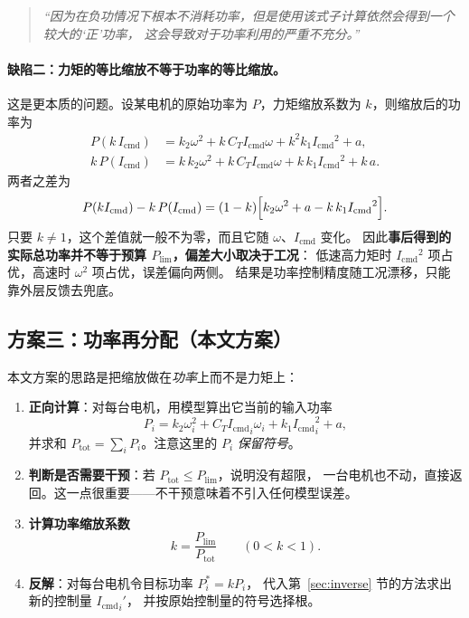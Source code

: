 \documentclass[cn,blue,11pt,device=normal]{elegantnote}
\newcommand{\Icmd}{I_{\mathrm{cmd}}{}}
\newcommand{\CT}{C_{T}{}}
\newcommand{\Plim}{P_{\mathrm{lim}}{}}
\begin{document}
\begin{quote}
\itshape
“因为在负功情况下根本不消耗功率，但是使用该式子计算依然会得到一个较大的‘正’功率，
这会导致对于功率利用的严重不充分。”
\end{quote}

\paragraph{缺陷二：力矩的等比缩放不等于功率的等比缩放。}
这是更本质的问题。设某电机的原始功率为 $P$，力矩缩放系数为 $k$，则缩放后的功率为
\begin{align}
  P(k\,\Icmd) &= k_2\omega^2 + k\,\CT\Icmd\omega + k^{2}k_1\Icmd^{2} + a ,\\
  k\,P(\Icmd) &= k\,k_2\omega^2 + k\,\CT\Icmd\omega + k\,k_1\Icmd^{2} + k\,a .
\end{align}
两者之差为
\begin{equation}\label{eq:scalegap}
  P(k\Icmd) - k\,P(\Icmd)
  = (1-k)\Bigl[k_2\omega^2 + a - k\,k_1\Icmd^{2}\Bigr] .
\end{equation}
只要 $k\ne1$，这个差值就一般不为零，而且它随 $\omega$、$\Icmd$ 变化。
因此\textbf{事后得到的实际总功率并不等于预算 $\Plim$，偏差大小取决于工况}：
低速高力矩时 $\Icmd^2$ 项占优，高速时 $\omega^2$ 项占优，误差偏向两侧。
结果是功率控制精度随工况漂移，只能靠外层反馈去兜底。

\subsection{方案三：功率再分配（本文方案）}

本文方案的思路是把缩放做在\emph{功率}上而不是力矩上：

\begin{enumerate}
  \item \textbf{正向计算}：对每台电机，用模型算出它当前的输入功率
  \begin{equation}\label{eq:forward}
    P_i = k_2\omega_i^{2} + \CT{\Icmd}_i\omega_i + k_1{\Icmd}_i^{2} + a ,
  \end{equation}
  并求和 $P_{\mathrm{tot}} = \sum_i P_i$。注意这里的 $P_i$ \emph{保留符号}。
  \item \textbf{判断是否需要干预}：若 $P_{\mathrm{tot}} \le \Plim$，说明没有超限，
  一台电机也不动，直接返回。这一点很重要——不干预意味着不引入任何模型误差。
  \item \textbf{计算功率缩放系数}
  \begin{equation}\label{eq:kscale}
    k = \frac{\Plim}{P_{\mathrm{tot}}} \qquad (0<k<1).
  \end{equation}
  \item \textbf{反解}：对每台电机令目标功率 $P_i^{\ast} = kP_i$，
  代入第~\ref{sec:inverse} 节的方法求出新的控制量 ${\Icmd}_i'$，
  并按原始控制量的符号选择根。
\end{enumerate}
\end{document}
